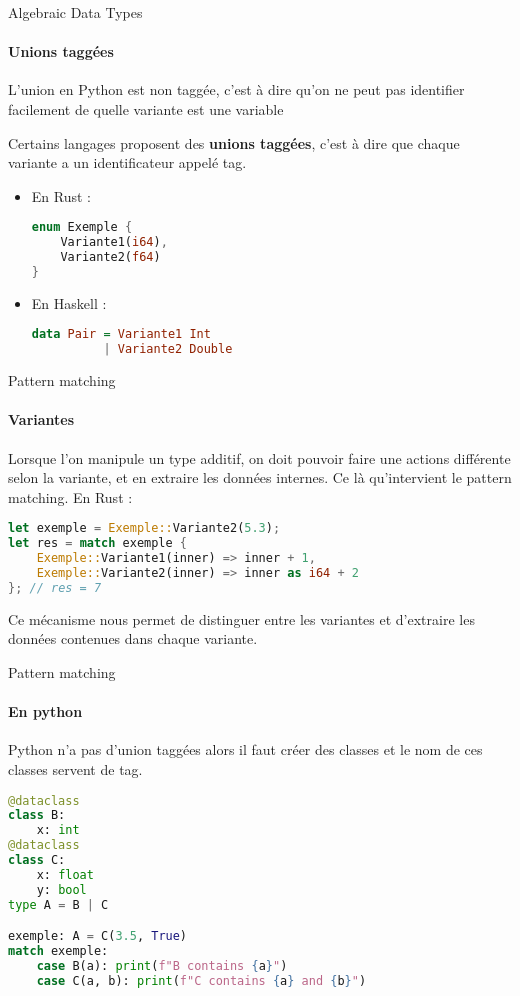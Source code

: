 \documentclass[aspectratio=169]{beamer}
\begin{document}
\begin{frame}[fragile]{Algebraic Data Types}
    \framesubtitle{Unions taggées}
    L'union en Python est non taggée, c'est à dire qu'on ne peut pas identifier facilement de quelle variante est une variable

    Certains langages proposent des \textbf{unions taggées}, c'est à dire que chaque variante a un identificateur appelé tag.

    \begin{itemize}
    \item En Rust :
    \begin{lstlisting}[language=Rust]
enum Exemple {
    Variante1(i64),
    Variante2(f64)
}
    \end{lstlisting}

    \item En Haskell :
    \begin{lstlisting}[language=Haskell]
data Pair = Variante1 Int 
          | Variante2 Double
    \end{lstlisting}
    \end{itemize}
\end{frame}

\begin{frame}[fragile]{Pattern matching}
    \framesubtitle{Variantes}
    Lorsque l'on manipule un type additif, on doit pouvoir faire une actions différente selon la variante, et en extraire les données internes. Ce là qu'intervient le pattern matching.
    En Rust :
    \begin{lstlisting}[language=Rust]
let exemple = Exemple::Variante2(5.3);
let res = match exemple {
    Exemple::Variante1(inner) => inner + 1,
    Exemple::Variante2(inner) => inner as i64 + 2
}; // res = 7
    \end{lstlisting}
    Ce mécanisme nous permet de distinguer entre les variantes et d'extraire les données contenues dans chaque variante.
\end{frame}

\begin{frame}[fragile]{Pattern matching}
    \framesubtitle{En python}
    Python n'a pas d'union taggées alors il faut créer des classes et le nom de ces classes servent de tag.
    \begin{lstlisting}[language=Python]
@dataclass
class B: 
    x: int
@dataclass
class C:
    x: float
    y: bool
type A = B | C

exemple: A = C(3.5, True)
match exemple:
    case B(a): print(f"B contains {a}")
    case C(a, b): print(f"C contains {a} and {b}") 
    \end{lstlisting}
\end{frame}
\end{document}
